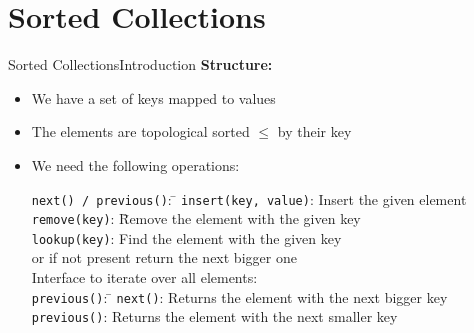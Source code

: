 \section{Sorted Collections}

\begin{frame}{Sorted Collections}{Introduction}
  \textbf{Structure:}
  \begin{itemize}
    \item
      We have a set of {\color{Mittel-Blau}keys} mapped to
      {\color{Mittel-Blau}values}
    \item
      The elements are topological sorted {\color{Mittel-Blau}$\leq$} by their
      {\color{Mittel-Blau}key}
    \item
      We need the following operations:
      \begin{tabbing}
        {\color{Mittel-Blau}\texttt{next() / previous()}}: \=\kill
        {\color{Mittel-Blau}\texttt{insert(key, value)}}: \>
        Insert the given element\\
        {\color{Mittel-Blau}\texttt{remove(key)}}: \=
        Remove the element with the given {\color{Mittel-Blau}key}\\
        {\color{Mittel-Blau}\texttt{lookup(key)}}: \>
        Find the element with the given {\color{Mittel-Blau}key}\\
        \> or if not present return the next bigger one\\[0.5em]
        Interface to iterate over all elements:\\
        {\color{Mittel-Blau}\texttt{previous()}}: \= \kill
        {\color{Mittel-Blau}\texttt{next()}}:
        \> Returns the element with the next bigger {\color{Mittel-Blau}key}\\
        {\color{Mittel-Blau}\texttt{previous()}}:
        \> Returns the element with the next smaller {\color{Mittel-Blau}key}
      \end{tabbing}
  \end{itemize}
\end{frame}


